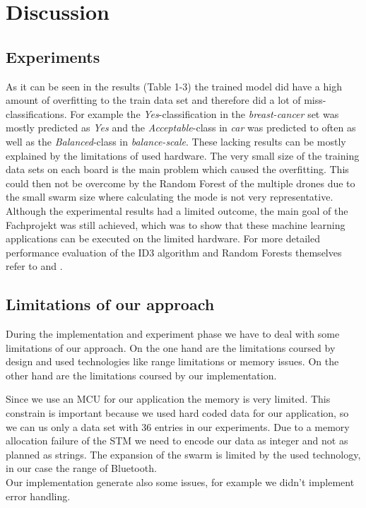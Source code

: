 \newpage

\section{Discussion}
\subsection*{Experiments}
As it can be seen in the results (Table 1-3) the trained model did have a high amount of overfitting to the train data set and therefore did a lot of miss-classifications. For example the \textit{Yes}-classification in the \textit{breast-cancer} set was mostly predicted as \textit{Yes} and the \textit{Acceptable}-class in \textit{car} was predicted to often as well as the \textit{Balanced}-class in \textit{balance-scale}. These lacking results can be mostly explained by the limitations of used hardware. The very small size of the training data sets on each board is the main problem which caused the overfitting. This could then not be overcome by the Random Forest of the multiple drones due to the small swarm size where calculating the mode is not very representative. \\
Although the experimental results had a limited outcome, the main goal of the Fachprojekt was still achieved, which was to show that these machine learning applications can be executed on the limited hardware. For more detailed performance evaluation of the ID3 algorithm and Random Forests themselves refer to \cite{5991826} and \cite{RODRIGUEZGALIANO201293}. 

\subsection*{Limitations of our approach}
During the implementation and experiment phase we have to deal with some limitations of our approach.
On the one hand are the limitations coursed by design and used technologies like range limitations or memory issues.
On the other hand are the limitations coursed by our implementation.

Since we use an MCU for our application the memory is very limited.
This constrain is important because we used hard coded data for our application, so we can us only a data set with 36 entries in our experiments.
Due to a memory allocation failure of the STM we need to encode our data as integer and not as planned as strings.
The expansion of the swarm is limited by the used technology, in our case the range of Bluetooth.\\
Our implementation generate also some issues, for example we didn't implement error handling.  

